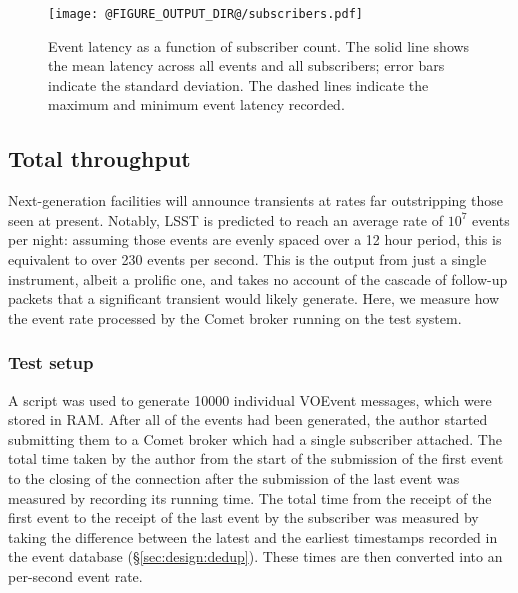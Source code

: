 \documentclass[5p,authoryear]{elsarticle}
\begin{document}
\begin{figure}
  \begin{center}
  \texttt{[image: @FIGURE\_OUTPUT\_DIR@/subscribers.pdf]}
  \end{center}

  \caption{Event latency as a function of subscriber count. The solid line
  shows the mean latency across all events and all subscribers; error bars
  indicate the standard deviation. The dashed lines indicate the maximum and
  minimum event latency recorded.}

  \label{fig:subscribers}
\end{figure}


\subsection{Total throughput}
\label{sec:perf:total}

Next-generation facilities will announce transients at rates far outstripping
those seen at present. Notably, LSST is predicted to reach an average rate of
$10^7$ events per night: assuming those events are evenly spaced over a 12
hour period, this is equivalent to over 230 events per second. This is the
output from just a single instrument, albeit a prolific one, and takes no
account of the cascade of follow-up packets that a significant transient would
likely generate. Here, we measure how the event rate processed by the Comet
broker running on the test system.

\subsubsection{Test setup}
\label{sec:perf:total:setup}

A script was used to generate 10000 individual VOEvent messages, which were
stored in RAM\@. After all of the events had been generated, the author
started submitting them to a Comet broker which had a single subscriber
attached. The total time taken by the author from the start of the submission
of the first event to the closing of the connection after the submission of
the last event was measured by recording its running time. The total time from
the receipt of the first event to the receipt of the last event by the
subscriber was measured by taking the difference between the latest and the
earliest timestamps recorded in the event database (\S\ref{sec:design:dedup}).
These times are then converted into an per-second event rate.
\end{document}
